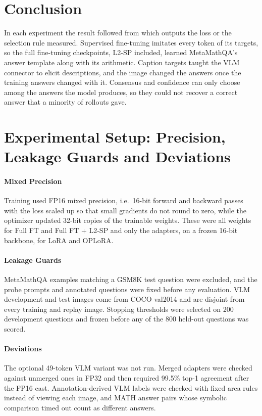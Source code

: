 \documentclass{article}
\begin{document}
\section{Conclusion}
\label{sec:conclusion}

In each experiment the result followed from which outputs the loss or the selection rule measured. Supervised fine-tuning imitates every token of its targets, so the full fine-tuning checkpoints, L2-SP included, learned MetaMathQA's answer template along with its arithmetic. Caption targets taught the VLM connector to elicit descriptions, and the image changed the answers once the training answers changed with it. Consensus and confidence can only choose among the answers the model produces, so they could not recover a correct answer that a minority of rollouts gave.




\appendix
\section{Experimental Setup: Precision, Leakage Guards and Deviations}
\label{app:dev}

\paragraph{Mixed Precision}
Training used FP16 mixed precision, i.e.\ 16-bit forward and backward passes with the loss scaled up so that small gradients do not round to zero, while the optimizer updated 32-bit copies of the trainable weights. These were all weights for Full FT and Full FT + L2-SP and only the adapters, on a frozen 16-bit backbone, for LoRA and OPLoRA.

\paragraph{Leakage Guards}
MetaMathQA examples matching a GSM8K test question were excluded, and the probe prompts and annotated questions were fixed before any evaluation. VLM development and test images come from COCO val2014 and are disjoint from every training and replay image. Stopping thresholds were selected on 200 development questions and frozen before any of the 800 held-out questions was scored.
\paragraph{Deviations}
The optional 49-token VLM variant was not run. Merged adapters were checked against unmerged ones in FP32 and then required 99.5\% top-1 agreement after the FP16 cast. Annotation-derived VLM labels were checked with fixed area rules instead of viewing each image, and MATH answer pairs whose symbolic comparison timed out count as different answers.
\end{document}
